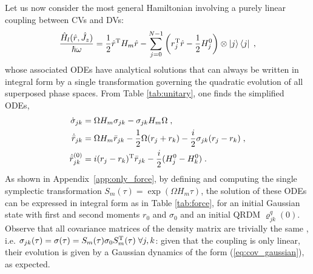 \documentclass[%
reprint,
superscriptaddress,
nofootinbib,
 amsmath,amssymb,
prx,
floatfix,
]{revtex4-2}
\begin{document}
Let us now consider the most general Hamiltonian involving a purely linear coupling between CVs and DVs:
\begin{equation}
\label{eq:Hamiltonian_force_only}
    \frac{\hat{H}_l (\hat{r}, \hat{J}_z)}{\hbar \omega} = \frac{1}{2} \hat{r}^{\rm T} H_{m} \hat{r} - \sum_{j = 0}^{N -1}\left(  r_{j} ^{\rm T} \hat{r} -  \frac{1}{2} H_j^0 \right)\otimes \ket{j} \bra{j}     \;,
\end{equation}
whose associated ODEs have analytical solutions that can always be written in integral form by a single transformation governing the quadratic evolution of all superposed phase spaces. From Table \ref{tab:unitary}, one finds the simplified ODEs,
\begin{align}
    \dot{\sigma}_{jk} &=  \Omega  H_m  \sigma_{jk} -  \sigma_{jk}  H_m \Omega \;, \nonumber  \\
    \dot{\bar{r}}_{jk} &=     \Omega  H_m  \bar{r}_{jk}  -   \frac{1}{2} \Omega (r_j + r_k) - \frac{i}{2}  \sigma_{jk} (r_j - r_k) \;, \nonumber  \\
    \dot{\bar{r}}_{jk}^{(0)} &=   i  (r_j - r_k)^{\rm T}   \bar{r}_{jk}   -  \frac{i}{2} (H_j^0-H_k^0) \;.
\end{align}
As shown in Appendix~\ref{app:only_force}, by defining and computing the single symplectic transformation $S_m (\tau) = \exp(  \Omega H_m \tau)$, the solution of these ODEs can be expressed in integral form as in Table \ref{tab:force}, for an initial Gaussian state with first and second moments $r_0$ and $\sigma_0$ and an initial QRDM $\varrho_{jk}^q (0)$. 
Observe that all covariance matrices of the density matrix are trivially the same , i.e. $\sigma_{jk}(\tau)  = \sigma (\tau) = S_m (\tau) \sigma_0 S_m^{\rm T} (\tau) \; \forall j,k$: given that the coupling is only linear, their evolution is given by a Gaussian dynamics of the form (\ref{eq:cov_gaussian}), as expected. 
\end{document}
